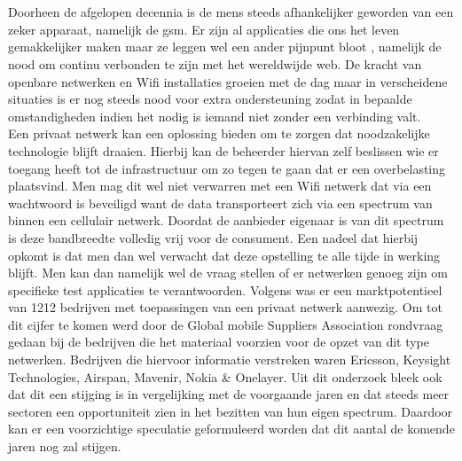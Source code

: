 
\chapter{}%
\label{ch:inleiding}

Doorheen de afgelopen decennia is de mens steeds afhankelijker geworden van een zeker apparaat, namelijk de gsm. Er zijn al applicaties die ons het leven gemakkelijker maken maar ze leggen wel een ander pijnpunt bloot , namelijk de nood om continu verbonden te zijn met het wereldwijde web. De kracht van openbare netwerken en Wifi installaties groeien met de dag maar in verscheidene situaties is er nog steeds nood voor extra ondersteuning zodat in bepaalde omstandigheden indien het nodig is iemand niet zonder een verbinding valt. \\
Een privaat netwerk kan een oplossing bieden om te zorgen dat noodzakelijke technologie blijft draaien. Hierbij kan de beheerder hiervan zelf beslissen wie er toegang heeft tot de infrastructuur om zo tegen te gaan dat er een overbelasting plaatsvind. Men mag dit wel niet verwarren met een Wifi netwerk dat via een wachtwoord is beveiligd want de data transporteert zich via een spectrum van binnen een cellulair netwerk. Doordat de aanbieder eigenaar is van dit spectrum is deze bandbreedte volledig vrij voor de consument. Een nadeel dat hierbij opkomt is dat men dan wel verwacht dat deze opstelling te alle tijde in werking blijft. Men kan dan namelijk wel de vraag stellen of er netwerken genoeg zijn om specifieke test applicaties te verantwoorden. Volgens \textcite{Dux2023}  was er een marktpotentieel van 1212 bedrijven met toepassingen van een privaat netwerk aanwezig. Om tot dit cijfer te komen werd door de Global mobile Suppliers Association rondvraag gedaan bij de bedrijven die het materiaal voorzien voor de opzet van dit type netwerken. Bedrijven die hiervoor informatie verstreken waren Ericsson, Keysight Technologies, Airspan, Mavenir, Nokia \& Onelayer. Uit dit onderzoek bleek ook dat dit een stijging is in vergelijking met de voorgaande jaren en dat steeds meer sectoren een opportuniteit zien in het bezitten van hun eigen spectrum. Daardoor kan er een voorzichtige speculatie geformuleerd worden dat dit aantal de komende jaren nog zal stijgen.
\section{}%
\label{sec:probleemstelling}

